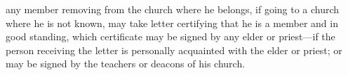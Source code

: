 		\begin{framed}
		\scriptsize
			\begin{compactdesc}
				\item[JSP] any member removing from the church where he belongs, if going to a church where he is not known, may take letter certifying that he is a member and in good standing, which certificate may be signed by any elder or priest---if the person receiving the letter is personally acquainted with the elder or priest; or may be signed by the teachers or deacons of his church.
				\item[RB1] 
				\item[BC] 
			\end{compactdesc}
		\end{framed}